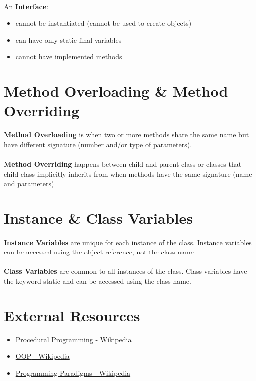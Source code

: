 \documentclass{article}
\begin{document}
\paragraph{} An \textbf{Interface}:
\begin{itemize}
	\item cannot be instantiated (cannot be used to create objects)
	\item can have only static final variables
	\item cannot have implemented methods
\end{itemize}


\section{Method Overloading \& Method Overriding}
\label{sec:method-overloading}
\label{sec:method-overriding}
\paragraph{} \textbf{Method Overloading} is when two or more methods share the same name but have different signature (number and/or type of parameters).
\paragraph{} \textbf{Method Overriding} happens between child and parent class or classes that child class implicitly inherits from when methods have the same signature (name and parameters)


\section{Instance \& Class Variables}
\paragraph{} \textbf{Instance Variables} are unique for each instance of the class. Instance variables can be accessed using the object reference, not the class name.
\paragraph{} \textbf{Class Variables} are common to all instances of the class. Class variables have the keyword static and can be accessed using the class name.


\newpage %
\section{External Resources}
\begin{itemize}
\item\href{https://en.wikipedia.org/wiki/Procedural_programming}{Procedural Programming - Wikipedia}
\item\href{https://en.wikipedia.org/wiki/Object-oriented_programming}{\acl{OOP} - Wikipedia}
\item\href{https://en.wikipedia.org/wiki/Programming_paradigm}{Programming Paradigms - Wikipedia}
\end{itemize}
\end{document}
